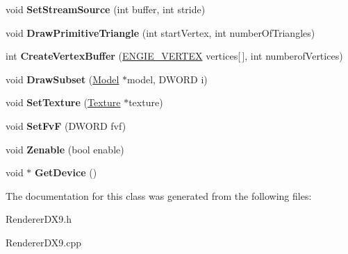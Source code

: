 \begin{DoxyCompactItemize}
\item 
\hypertarget{class_renderer_d_x9_ab47cf24b00aea70cee4c15a8ce6fade7}{void {\bfseries Set\-Stream\-Source} (int buffer, int stride)}\label{class_renderer_d_x9_ab47cf24b00aea70cee4c15a8ce6fade7}

\item 
\hypertarget{class_renderer_d_x9_aaafcf651470404e9d177f659c051ab0c}{void {\bfseries Draw\-Primitive\-Triangle} (int start\-Vertex, int number\-Of\-Triangles)}\label{class_renderer_d_x9_aaafcf651470404e9d177f659c051ab0c}

\item 
\hypertarget{class_renderer_d_x9_adf76b988cc846b89c54a3b28976b9a9d}{int {\bfseries Create\-Vertex\-Buffer} (\hyperlink{struct_e_n_g_i_e___v_e_r_t_e_x}{E\-N\-G\-I\-E\-\_\-\-V\-E\-R\-T\-E\-X} vertices\mbox{[}$\,$\mbox{]}, int numberof\-Vertices)}\label{class_renderer_d_x9_adf76b988cc846b89c54a3b28976b9a9d}

\item 
\hypertarget{class_renderer_d_x9_ae9656f2589ffb2e0c90d1f09d4435e85}{void {\bfseries Draw\-Subset} (\hyperlink{class_model}{Model} $\ast$model, D\-W\-O\-R\-D i)}\label{class_renderer_d_x9_ae9656f2589ffb2e0c90d1f09d4435e85}

\item 
\hypertarget{class_renderer_d_x9_aeb38155c8f9982e9db98f3c76bc934e4}{void {\bfseries Set\-Texture} (\hyperlink{class_texture}{Texture} $\ast$texture)}\label{class_renderer_d_x9_aeb38155c8f9982e9db98f3c76bc934e4}

\item 
\hypertarget{class_renderer_d_x9_a9dbe602a16c0a7366d39543cb6ac8e01}{void {\bfseries Set\-Fv\-F} (D\-W\-O\-R\-D fvf)}\label{class_renderer_d_x9_a9dbe602a16c0a7366d39543cb6ac8e01}

\item 
\hypertarget{class_renderer_d_x9_ab926f285ad9f3b088ac0289e555d1df2}{void {\bfseries Zenable} (bool enable)}\label{class_renderer_d_x9_ab926f285ad9f3b088ac0289e555d1df2}

\item 
\hypertarget{class_renderer_d_x9_a9431af486dd19440d02a6bdeeea7658b}{void $\ast$ {\bfseries Get\-Device} ()}\label{class_renderer_d_x9_a9431af486dd19440d02a6bdeeea7658b}

\end{DoxyCompactItemize}


The documentation for this class was generated from the following files\-:\begin{DoxyCompactItemize}
\item 
Renderer\-D\-X9.\-h\item 
Renderer\-D\-X9.\-cpp\end{DoxyCompactItemize}
